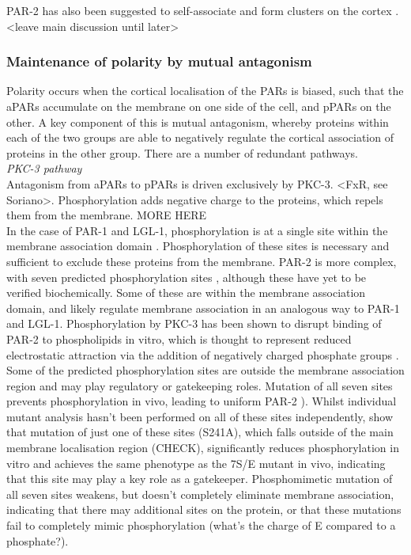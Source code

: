\documentclass[12pt]{"article"}
\begin{document}
PAR-2 has also been suggested to self-associate and form clusters on the cortex \citep{Arata2016}. <leave main discussion until later>\\


\subsubsection{Maintenance of polarity by mutual antagonism}

Polarity occurs when the cortical localisation of the PARs is biased, such that the aPARs accumulate on the membrane on one side of the cell, and pPARs on the other. A key component of this is mutual antagonism, whereby proteins within each of the two groups are able to negatively regulate the cortical association of proteins in the other group. There are a number of redundant pathways.\\

\textit{PKC-3 pathway}\\ 

Antagonism from aPARs to pPARs is driven exclusively by PKC-3. <FxR, see Soriano>. Phosphorylation adds negative charge to the proteins, which repels them from the membrane. MORE HERE\\

In the case of PAR-1 and LGL-1, phosphorylation is at a single site within the membrane association domain \citep{Hoege2010}\citep{Motegi2011}. Phosphorylation of these sites is necessary and sufficient to exclude these proteins from the membrane. PAR-2 is more complex, with seven predicted phosphorylation sites \citep{Hao2006}, although these have yet to be verified biochemically. Some of these are within the membrane association domain, and likely regulate membrane association in an analogous way to PAR-1 and LGL-1. Phosphorylation by PKC-3 has been shown to disrupt binding of PAR-2 to phospholipids in vitro, which is thought to represent reduced electrostatic attraction via the addition of negatively charged phosphate groups \citep{Motegi2011}. Some of the predicted phosphorylation sites are outside the membrane association region and may play regulatory or gatekeeping roles. Mutation of all seven sites prevents phosphorylation in vivo, leading to uniform PAR-2 \citep{Hao2006}). Whilst individual mutant analysis hasn’t been performed on all of these sites independently, \textcite{Motegi2011} show that mutation of just one of these sites (S241A), which falls outside of the main membrane localisation region (CHECK), significantly reduces phosphorylation in vitro and achieves the same phenotype as the 7S/E mutant in vivo, indicating that this site may play a key role as a gatekeeper. Phosphomimetic mutation of all seven sites weakens, but doesn’t completely eliminate membrane association, indicating that there may additional sites on the protein, or that these mutations fail to completely mimic phosphorylation (what’s the charge of E compared to a phosphate?). \\
\end{document}
